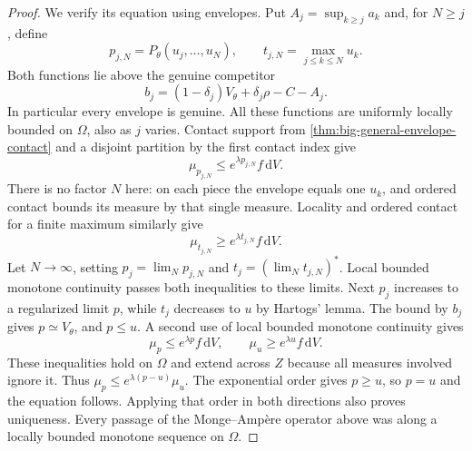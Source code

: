 \begin{proof}
We verify its equation using envelopes. Put $A_j=\sup_{k\geq j}a_k$ and, for $N\geq j$, define
\[
 p_{j,N}=P_\theta(u_j,\ldots,u_N),\qquad
 t_{j,N}=\max_{j\leq k\leq N}u_k.
\]
Both functions lie above the genuine competitor
\[
 b_j=(1-\delta_j)V_\theta+\delta_j\rho-C-A_j.
\]
In particular every envelope is genuine. All these functions are uniformly locally bounded on $\Omega$, also as $j$ varies. Contact support from \cref{thm:big-general-envelope-contact} and a disjoint partition by the first contact index give
\[
 \mu_{p_{j,N}}\leq e^{\lambda p_{j,N}}f\,\mathrm{d}V.
\]
There is no factor $N$ here: on each piece the envelope equals one $u_k$, and ordered contact bounds its measure by that single measure. Locality and ordered contact for a finite maximum similarly give
\[
 \mu_{t_{j,N}}\geq e^{\lambda t_{j,N}}f\,\mathrm{d}V.
\]
Let $N\to\infty$, setting $p_j=\lim_Np_{j,N}$ and $t_j=(\lim_Nt_{j,N})^*$. Local bounded monotone continuity passes both inequalities to these limits. Next $p_j$ increases to a regularized limit $p$, while $t_j$ decreases to $u$ by Hartogs' lemma. The bound by $b_j$ gives $p\simeq V_\theta$, and $p\leq u$. A second use of local bounded monotone continuity gives
\[
 \mu_p\leq e^{\lambda p}f\,\mathrm{d}V,
 \qquad \mu_u\geq e^{\lambda u}f\,\mathrm{d}V.
\]
These inequalities hold on $\Omega$ and extend across $Z$ because all measures involved ignore it. Thus
$\mu_p\leq e^{\lambda(p-u)}\mu_u$. The exponential order gives $p\geq u$, so $p=u$ and the equation follows. Applying that order in both directions also proves uniqueness. Every passage of the Monge--Amp\`ere operator above was along a locally bounded monotone sequence on $\Omega$.
\end{proof}

